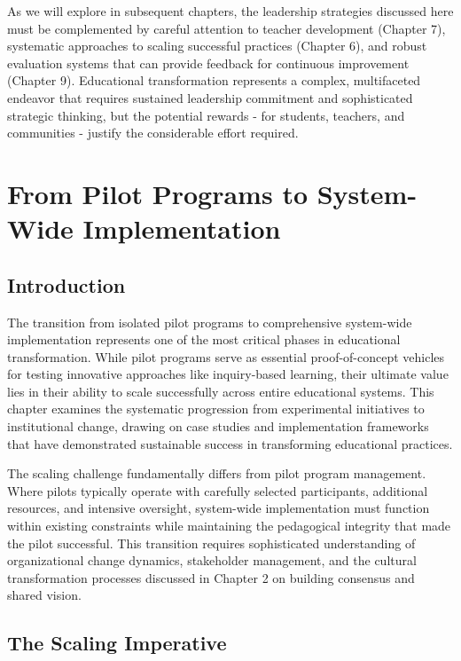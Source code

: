 \documentclass[
  Letterpaper,
]{scrbook}
\begin{document}
As we will explore in subsequent chapters, the leadership strategies
discussed here must be complemented by careful attention to teacher
development (Chapter 7), systematic approaches to scaling successful
practices (Chapter 6), and robust evaluation systems that can provide
feedback for continuous improvement (Chapter 9). Educational
transformation represents a complex, multifaceted endeavor that requires
sustained leadership commitment and sophisticated strategic thinking,
but the potential rewards - for students, teachers, and communities -
justify the considerable effort required.


\chapter{From Pilot Programs to System-Wide
Implementation}\label{from-pilot-programs-to-system-wide-implementation}

\section{Introduction}\label{introduction-4}

The transition from isolated pilot programs to comprehensive system-wide
implementation represents one of the most critical phases in educational
transformation. While pilot programs serve as essential proof-of-concept
vehicles for testing innovative approaches like inquiry-based learning,
their ultimate value lies in their ability to scale successfully across
entire educational systems. This chapter examines the systematic
progression from experimental initiatives to institutional change,
drawing on case studies and implementation frameworks that have
demonstrated sustainable success in transforming educational practices.

The scaling challenge fundamentally differs from pilot program
management. Where pilots typically operate with carefully selected
participants, additional resources, and intensive oversight, system-wide
implementation must function within existing constraints while
maintaining the pedagogical integrity that made the pilot successful.
This transition requires sophisticated understanding of organizational
change dynamics, stakeholder management, and the cultural transformation
processes discussed in Chapter 2 on building consensus and shared
vision.

\section{The Scaling Imperative}\label{the-scaling-imperative}
\end{document}
